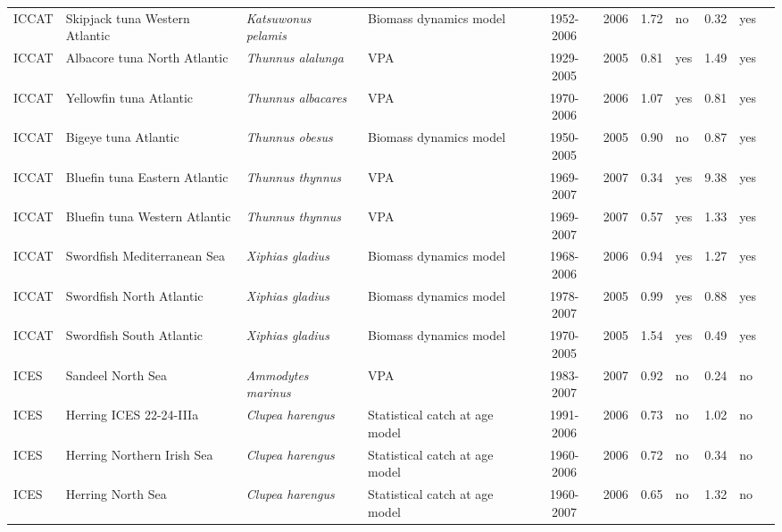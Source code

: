 \begin{longtable}{p{1.8cm}p{3.5cm}p{3.5cm}p{3cm}cccp{0.9cm}cp{0.9cm}c}
  ICCAT & Skipjack tuna Western Atlantic & \textit{Katsuwonus pelamis} & Biomass dynamics model & 1952-2006 & 2006 & 1.72 & no & 0.32 & yes & \cite{JENSEN-YFINATL-2008.pdf} \\ 
  ICCAT & Albacore tuna North Atlantic & \textit{Thunnus alalunga} & VPA & 1929-2005 & 2005 & 0.81 & yes & 1.49 & yes & \cite{ref2007-ALB-STOCK-ASSESS-REP.pdf} \\ 
  ICCAT & Yellowfin tuna Atlantic & \textit{Thunnus albacares} & VPA & 1970-2006 & 2006 & 1.07 & yes & 0.81 & yes & \cite{JENSEN-YFINATL-2008.pdf} \\ 
  ICCAT & Bigeye tuna Atlantic & \textit{Thunnus obesus} & Biomass dynamics model & 1950-2005 & 2005 & 0.90 & no & 0.87 & yes & \cite{JENSEN-BIGEYEATL-2008.pdf} \\ 
  ICCAT & Bluefin tuna Eastern Atlantic & \textit{Thunnus thynnus} & VPA & 1969-2007 & 2007 & 0.34 & yes & 9.38 & yes & \cite{ref2008-BFT-STOCK-ASSESS-REP.pdf} \\ 
  ICCAT & Bluefin tuna Western Atlantic & \textit{Thunnus thynnus} & VPA & 1969-2007 & 2007 & 0.57 & yes & 1.33 & yes & \cite{ref2008-BFT-STOCK-ASSESS-REP.pdf} \\ 
  ICCAT & Swordfish Mediterranean Sea & \textit{Xiphias gladius} & Biomass dynamics model & 1968-2006 & 2006 & 0.94 & yes & 1.27 & yes & \cite{ICCAT-Mediterranean-Xiphiasgladius-2007.pdf} \\ 
  ICCAT & Swordfish North Atlantic & \textit{Xiphias gladius} & Biomass dynamics model & 1978-2007 & 2005 & 0.99 & yes & 0.88 & yes & \cite{JENSEN-SWORDSATL-2007.pdf} \\ 
  ICCAT & Swordfish South Atlantic & \textit{Xiphias gladius} & Biomass dynamics model & 1970-2005 & 2005 & 1.54 & yes & 0.49 & yes & \cite{JENSEN-SWORDSATL-2007.pdf} \\ 
  ICES & Sandeel North Sea & \textit{Ammodytes marinus} & VPA & 1983-2007 & 2007 & 0.92 & no & 0.24 & no & \cite{ICES-WGNSSK-2007.pdf} \\ 
  ICES & Herring ICES 22-24-IIIa & \textit{Clupea harengus} & Statistical catch at age model & 1991-2006 & 2006 & 0.73 & no & 1.02 & no & \cite{ICES-HAWG-2007.pdf} \\ 
  ICES & Herring Northern Irish Sea & \textit{Clupea harengus} & Statistical catch at age model & 1960-2006 & 2006 & 0.72 & no & 0.34 & no & \cite{ICES-HAWG-2007.pdf} \\ 
  ICES & Herring North Sea & \textit{Clupea harengus} & Statistical catch at age model & 1960-2007 & 2006 & 0.65 & no & 1.32 & no & \cite{ICES-HAWG-2007.pdf} \\ 

\end{longtable}
